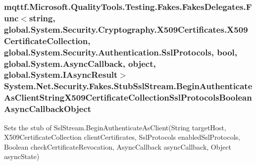 \hypertarget{class_system_1_1_net_1_1_security_1_1_fakes_1_1_stub_ssl_stream_a56a22f609b0ec4b7d4dee50b2afae7da}{
\subsubsection[{Begin\-Authenticate\-As\-Client\-String\-X509\-Certificate\-Collection\-Ssl\-Protocols\-Boolean\-Async\-Callback\-Object}]{\setlength{\rightskip}{0pt plus 5cm}mqttf.\-Microsoft.\-Quality\-Tools.\-Testing.\-Fakes.\-Fakes\-Delegates.\-Func$<$string, global.\-System.\-Security.\-Cryptography.\-X509\-Certificates.\-X509\-Certificate\-Collection, global.\-System.\-Security.\-Authentication.\-Ssl\-Protocols, bool, global.\-System.\-Async\-Callback, object, global.\-System.\-I\-Async\-Result$>$ System.\-Net.\-Security.\-Fakes.\-Stub\-Ssl\-Stream.\-Begin\-Authenticate\-As\-Client\-String\-X509\-Certificate\-Collection\-Ssl\-Protocols\-Boolean\-Async\-Callback\-Object}}\label{class_system_1_1_net_1_1_security_1_1_fakes_1_1_stub_ssl_stream_a56a22f609b0ec4b7d4dee50b2afae7da}


Sets the stub of Ssl\-Stream.\-Begin\-Authenticate\-As\-Client(\-String target\-Host, X509\-Certificate\-Collection client\-Certificates, Ssl\-Protocols enabled\-Ssl\-Protocols, Boolean check\-Certificate\-Revocation, Async\-Callback async\-Callback, Object async\-State)

